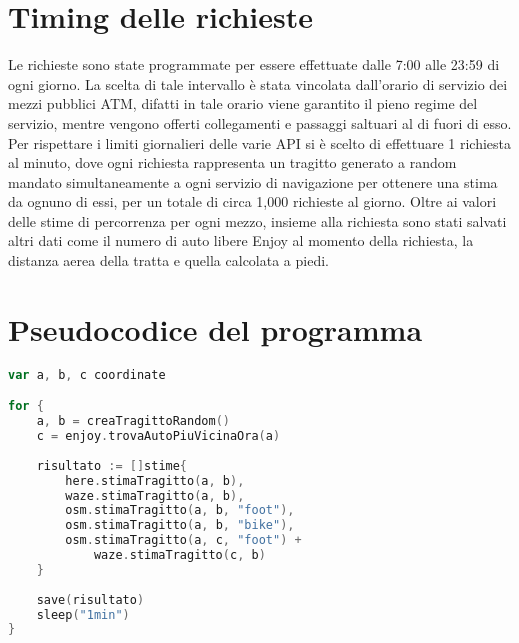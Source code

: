 \section{Timing delle richieste}

Le richieste sono state programmate per essere effettuate dalle 7:00 alle 23:59 di ogni giorno. La scelta di tale intervallo è stata vincolata dall'orario di servizio dei mezzi pubblici ATM, difatti in tale orario viene garantito il pieno regime del servizio, mentre vengono offerti collegamenti e passaggi saltuari al di fuori di esso.
Per rispettare i limiti giornalieri delle varie API si è scelto di effettuare 1 richiesta al minuto, dove ogni richiesta rappresenta un tragitto generato a random mandato simultaneamente a ogni servizio di navigazione per ottenere una stima da ognuno di essi, per un totale di circa 1,000 richieste al giorno. Oltre ai valori delle stime di percorrenza per ogni mezzo, insieme alla richiesta sono stati salvati altri dati come il numero di auto libere Enjoy al momento della richiesta, la distanza aerea della tratta e quella calcolata a piedi. 

\section{Pseudocodice del programma}

\begin{lstlisting}[language=Go]
var a, b, c coordinate

for {
	a, b = creaTragittoRandom()
	c = enjoy.trovaAutoPiuVicinaOra(a)
	
	risultato := []stime{
		here.stimaTragitto(a, b),
		waze.stimaTragitto(a, b),
		osm.stimaTragitto(a, b, "foot"),
		osm.stimaTragitto(a, b, "bike"),
		osm.stimaTragitto(a, c, "foot") +
			waze.stimaTragitto(c, b)
	}
	
	save(risultato)
	sleep("1min")
}
\end{lstlisting}